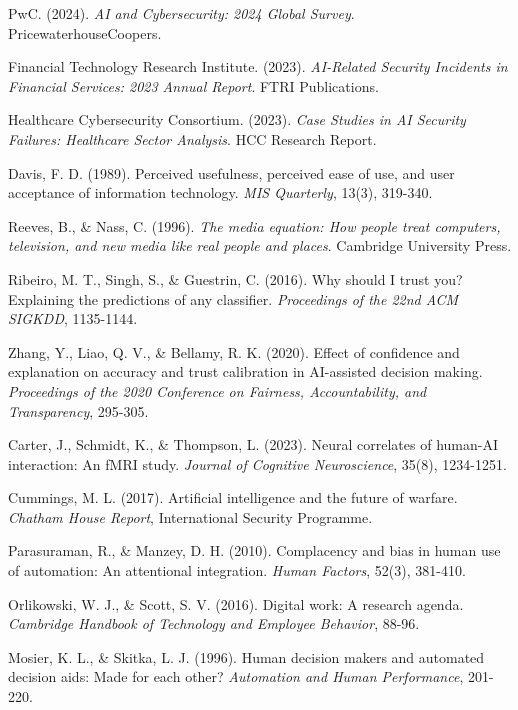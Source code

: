 \documentclass[11pt,a4paper]{article}
\begin{document}
\begin{thebibliography}{99}

PwC. (2024). \textit{AI and Cybersecurity: 2024 Global Survey}. PricewaterhouseCoopers.

Financial Technology Research Institute. (2023). \textit{AI-Related Security Incidents in Financial Services: 2023 Annual Report}. FTRI Publications.

Healthcare Cybersecurity Consortium. (2023). \textit{Case Studies in AI Security Failures: Healthcare Sector Analysis}. HCC Research Report.

Davis, F. D. (1989). Perceived usefulness, perceived ease of use, and user acceptance of information technology. \textit{MIS Quarterly}, 13(3), 319-340.

Reeves, B., \& Nass, C. (1996). \textit{The media equation: How people treat computers, television, and new media like real people and places}. Cambridge University Press.

Ribeiro, M. T., Singh, S., \& Guestrin, C. (2016). Why should I trust you? Explaining the predictions of any classifier. \textit{Proceedings of the 22nd ACM SIGKDD}, 1135-1144.

Zhang, Y., Liao, Q. V., \& Bellamy, R. K. (2020). Effect of confidence and explanation on accuracy and trust calibration in AI-assisted decision making. \textit{Proceedings of the 2020 Conference on Fairness, Accountability, and Transparency}, 295-305.

Carter, J., Schmidt, K., \& Thompson, L. (2023). Neural correlates of human-AI interaction: An fMRI study. \textit{Journal of Cognitive Neuroscience}, 35(8), 1234-1251.

Cummings, M. L. (2017). Artificial intelligence and the future of warfare. \textit{Chatham House Report}, International Security Programme.

Parasuraman, R., \& Manzey, D. H. (2010). Complacency and bias in human use of automation: An attentional integration. \textit{Human Factors}, 52(3), 381-410.

Orlikowski, W. J., \& Scott, S. V. (2016). Digital work: A research agenda. \textit{Cambridge Handbook of Technology and Employee Behavior}, 88-96.

Mosier, K. L., \& Skitka, L. J. (1996). Human decision makers and automated decision aids: Made for each other? \textit{Automation and Human Performance}, 201-220.


\end{thebibliography}
\end{document}
